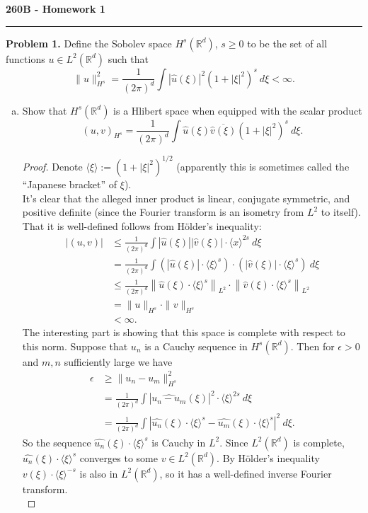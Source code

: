 \documentclass[11pt,letterpaper]{report}
\newcommand{\reals}{\mathbb{R}}
\newcommand{\Lp}[2]{\left\|{#1}\right\|_{L^{#2}}}
\begin{document}
\begin{center}
{\bf \Large 260B - Homework 1} %
\vspace{0.2cm}
\hrule
\end{center}

\noindent\textbf{Problem 1. }Define the Sobolev space $H^s(\reals^d)$, $s\geq 0$ to be the set of all functions $u\in L^2(\reals^d)$ such that
\[
\|u\|_{H^s}^2 = \frac{1}{(2\pi)^d}\int |\widehat{u}(\xi)|^2(1+|\xi|^2)^s\ d\xi<\infty.
\]
\begin{enumerate}[(a)]
	\item Show that $H^s(\reals^d)$ is a Hlibert space when equipped with the scalar product
	\[
	(u,v)_{H^s} = \frac{1}{(2\pi)^d}\int \widehat{u}(\xi)\overline{\widehat{v}(\xi)}(1+|\xi|^2)^s\ d\xi.
	\]
	\begin{proof}
		Denote $\langle \xi\rangle:= (1+|\xi|^2)^{1/2}$ (apparently this is sometimes called the ``Japanese bracket'' of $\xi$).\\
		It's clear that the alleged inner product is linear, conjugate symmetric, and positive definite (since the Fourier transform is an isometry from $L^2$ to itself). That it is well-defined follows from H\"older's inequality:
		\begin{align*}
			|(u,v)| &\leq \frac{1}{(2\pi)^d}\int|\widehat{u}(\xi)||\widehat{v}(\xi)|\cdot \langle x\rangle^{2s}\ d\xi\\
			&= \frac{1}{(2\pi)^d}\int (|\widehat{u}(\xi)|\cdot \langle \xi\rangle^s)\cdot (|\widehat{v}(\xi)|\cdot \langle \xi\rangle^s)\ d\xi\\
			&\leq \frac{1}{(2\pi)^d}\Lp{\widehat{u}(\xi)\cdot \langle \xi\rangle^s}{2}\cdot \Lp{\widehat{v}(\xi)\cdot \langle \xi\rangle^s}{2}\\
			&= \|u\|_{H^s}\cdot \|v\|_{H^s}\\
			&<\infty.
		\end{align*}
		The interesting part is showing that this space is complete with respect to this norm. Suppose that $u_n$ is a Cauchy sequence in $H^s(\reals^d)$. Then for $\epsilon>0$ and $m,n$ sufficiently large we have
		\begin{align*}
			\epsilon &\geq \|u_n-u_m\|_{H^s}^2\\
			&= \frac{1}{(2\pi)^d}\int|\widehat{u_n-u_m}(\xi)|^2\cdot \langle \xi\rangle^{2s}\ d\xi\\
			&= \frac{1}{(2\pi)^d}\int|\widehat{u_n}(\xi)\cdot\langle \xi\rangle^s - \widehat{u_m}(\xi)\cdot \langle \xi\rangle^s|^2\ d\xi.
		\end{align*}
		So the sequence $\widehat{u_n}(\xi)\cdot\langle \xi\rangle^s$ is Cauchy in $L^2$. Since $L^2(\reals^d)$ is complete, $\widehat{u_n}(\xi)\cdot \langle \xi\rangle^s$ converges to some $v\in L^2(\reals^d)$. By H\"older's inequality $v(\xi)\cdot \langle \xi\rangle^{-s}$ is also in $L^2(\reals^d)$, so it has a well-defined inverse Fourier transform.\\


\end{proof}
\end{enumerate}
\end{document}
